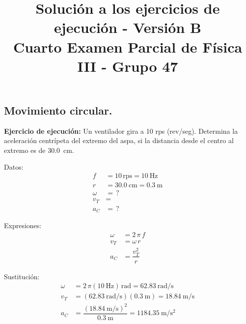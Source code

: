 \documentclass[12pt, letter]{exam}
\date{}
\title{Solución a los ejercicios de ejecución - Versión B \\ Cuarto Examen Parcial de Física III  - Grupo 47}
\begin{document}
\maketitle

\setcounter{page}{2}

\begin{questions}
    \section{Movimiento circular.}

    \setcounter{question}{4} \question \label{Ejercicio_02} \textbf{Ejercicio de ejecución: }  Un ventilador gira a 10 rps (rev/seg). Determina la aceleración centrípeta del extremo del aspa, si la distancia desde el centro al extremo es de \SI{30.0}{\centi\meter}.

    \begin{minipage}[t]{0.4\linewidth}
    Datos: 
    \begin{align*}
    f &= 10 \, \text{rps} = \SI{10}{\hertz} \\
    r &= \SI{30.0}{\centi\meter} = \SI{0.3}{\meter} \\
    \omega &= \, ? \\
    v_{T} &= \, \\
    a_{C} &= \, ?
    \end{align*}
    \end{minipage}
    \hspace{1cm}
    \begin{minipage}[t]{0.4\linewidth}
    Expresiones:
    \begin{align*}
    \omega &= 2 \, \pi \, f \\
    v_{T} &= \omega \, r \\
    a_{C} &= \dfrac{v_{T}^{2}}{r}
    \end{align*}
    \end{minipage}

    Sustitución:
    \begin{align*}
    \omega &= 2 \, \pi (\SI{10}{\hertz}) \, \unit{\radian} = \SI[per-mode=fraction]{62.83}{\radian\per\second} \\
    v_{T} &= \left( \SI[per-mode=fraction]{62.83}{\radian\per\second} \right) (\SI{0.3}{\meter}) = \SI[per-mode=fraction]{18.84}{\meter\per\second} \\
    a_{C} &= \dfrac{\left( \displaystyle \SI[per-mode=fraction]{18.84}{\meter\per\second} \right)^{2}}{\SI{0.3}{\meter}} = \SI[per-mode=fraction]{1184.35}{\meter\per\square\second}
    \end{align*}


\end{questions}
\end{document}
